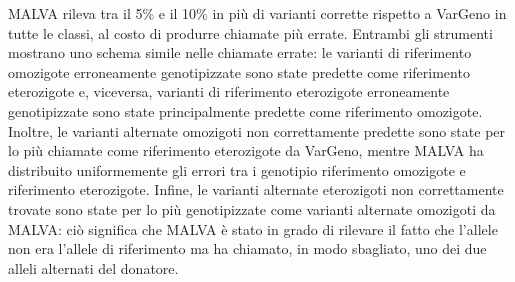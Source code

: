 \documentclass[../main.tex]{subfiles}
\begin{document}
MALVA rileva tra il 5\% e il 10\% in più di  varianti corrette rispetto a VarGeno in tutte le classi, al costo di produrre chiamate più errate. Entrambi gli strumenti mostrano uno schema simile nelle chiamate errate: le varianti di riferimento omozigote erroneamente genotipizzate sono state predette come riferimento eterozigote e, viceversa, varianti di riferimento eterozigote erroneamente genotipizzate sono state principalmente predette come riferimento omozigote. Inoltre, le varianti alternate omozigoti non correttamente predette sono state per lo più chiamate come riferimento eterozigote da VarGeno, mentre MALVA ha distribuito uniformemente gli errori tra i genotipio riferimento omozigote e riferimento eterozigote. Infine, le varianti alternate eterozigoti non correttamente trovate sono state per lo più genotipizzate come varianti alternate omozigoti da MALVA: ciò significa che MALVA  è stato in grado di rilevare il fatto che l'allele non era l'allele di riferimento ma ha chiamato, in modo sbagliato, uno dei due alleli alternati del donatore. 
\end{document}
